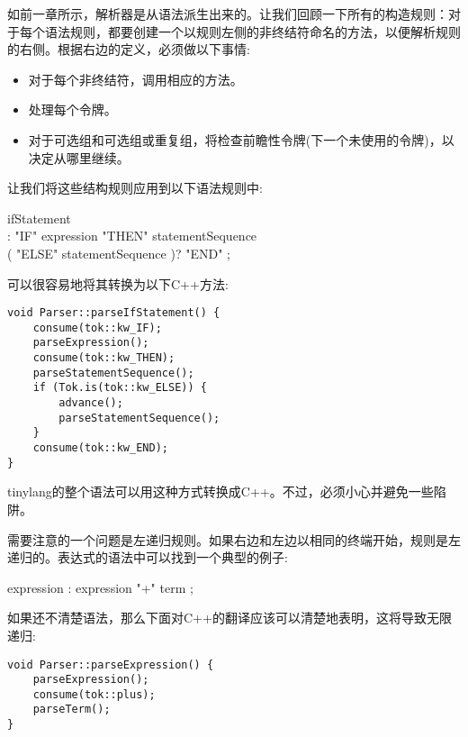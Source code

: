 如前一章所示，解析器是从语法派生出来的。让我们回顾一下所有的构造规则：对于每个语法规则，都要创建一个以规则左侧的非终结符命名的方法，以便解析规则的右侧。根据右边的定义，必须做以下事情:\par

\begin{itemize}
\item 对于每个非终结符，调用相应的方法。
\item 处理每个令牌。
\item 对于可选组和可选组或重复组，将检查前瞻性令牌(下一个未使用的令牌)，以决定从哪里继续。
\end{itemize}

让我们将这些结构规则应用到以下语法规则中:\par

\begin{tcolorbox}[colback=white,colframe=black]
ifStatement \\
\hspace*{0.5cm}: "IF" expression "THEN" statementSequence \\
\hspace*{1cm}( "ELSE" statementSequence )? "END" ;
\end{tcolorbox}

可以很容易地将其转换为以下C++方法:\par

\begin{lstlisting}[caption={}]
void Parser::parseIfStatement() {
	consume(tok::kw_IF);
	parseExpression();
	consume(tok::kw_THEN);
	parseStatementSequence();
	if (Tok.is(tok::kw_ELSE)) {
		advance();
		parseStatementSequence();
	}
	consume(tok::kw_END);
}
\end{lstlisting}

tinylang的整个语法可以用这种方式转换成C++。不过，必须小心并避免一些陷阱。\par

需要注意的一个问题是左递归规则。如果右边和左边以相同的终端开始，规则是左递归的。表达式的语法中可以找到一个典型的例子:\par

\begin{tcolorbox}[colback=white,colframe=black]
expression : expression "+" term ;
\end{tcolorbox}

如果还不清楚语法，那么下面对C++的翻译应该可以清楚地表明，这将导致无限递归:\par

\begin{lstlisting}[caption={}]
void Parser::parseExpression() {
	parseExpression();
	consume(tok::plus);
	parseTerm();
}
\end{lstlisting}

